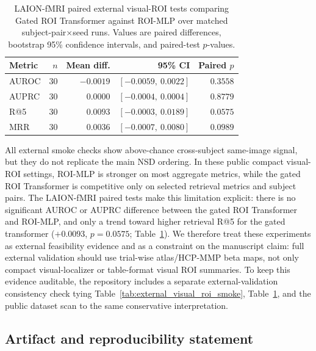 \documentclass{article}
\begin{document}
\begin{table}[!htbp]
  \centering
  \caption{LAION-fMRI paired external visual-ROI tests comparing Gated ROI Transformer against ROI-MLP over matched subject-pair$\times$seed runs. Values are paired differences, bootstrap 95\% confidence intervals, and paired-test $p$-values.}
  \label{tab:laion_external_pairwise}
  \scriptsize
  \setlength{\tabcolsep}{6pt}
  \renewcommand{\arraystretch}{1.15}
  \begin{tabular}{lrrrr}
    \toprule
    Metric & $n$ & Mean diff. & 95\% CI & Paired $p$ \\
    \midrule
    AUROC & 30 & $-0.0019$ & $[-0.0059,\ 0.0022]$ & $0.3558$ \\
    AUPRC & 30 & $0.0000$ & $[-0.0004,\ 0.0004]$ & $0.8779$ \\
    R@5 & 30 & $0.0093$ & $[-0.0003,\ 0.0189]$ & $0.0575$ \\
    MRR & 30 & $0.0036$ & $[-0.0007,\ 0.0080]$ & $0.0989$ \\
    \bottomrule
  \end{tabular}
\end{table}

All external smoke checks show above-chance cross-subject same-image signal, but they do not replicate the main NSD ordering. In these public compact visual-ROI settings, ROI-MLP is stronger on most aggregate metrics, while the gated ROI Transformer is competitive only on selected retrieval metrics and subject pairs. The LAION-fMRI paired tests make this limitation explicit: there is no significant AUROC or AUPRC difference between the gated ROI Transformer and ROI-MLP, and only a trend toward higher retrieval R@5 for the gated transformer ($+0.0093$, $p=0.0575$; Table~\ref{tab:laion_external_pairwise}). We therefore treat these experiments as external feasibility evidence and as a constraint on the manuscript claim: full external validation should use trial-wise atlas/HCP-MMP beta maps, not only compact visual-localizer or table-format visual ROI summaries. To keep this evidence auditable, the repository includes a separate external-validation consistency check tying Table~\ref{tab:external_visual_roi_smoke}, Table~\ref{tab:laion_external_pairwise}, and the public dataset scan to the same conservative interpretation.

\subsection{Artifact and reproducibility statement}
\end{document}
